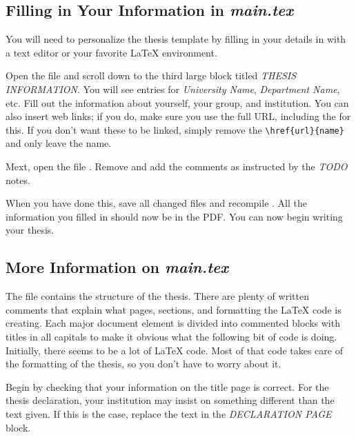 \subsection{Filling in Your Information in \emph{main.tex}}\label{sec:fillingdetails}

You will need to personalize the thesis template by filling in your details in  with a text editor or your favorite LaTeX environment.

Open the file and scroll down to the third large block titled \emph{THESIS INFORMATION}. You will see entries for \emph{University Name}, \emph{Department Name}, etc. Fill out the information about yourself, your group, and institution.%
You can also insert web links; if you do, make sure you use the full URL, including the  for this. If you don't want these to be linked, simply remove the \verb|\href{url}{name}| and only leave the name.

Mext, open the file . Remove and add the comments as instructed by the \emph{TODO} notes.

When you have done this, save all changed files and recompile . All the information you filled in should now be in the PDF. You can now begin writing your thesis.


\subsection{More Information on \emph{main.tex}}

The  file contains the structure of the thesis. There are plenty of written comments that explain what pages, sections, and formatting the LaTeX code is creating.
Each major document element is divided into commented blocks with titles in all capitals to make it obvious what the following bit of code is doing. Initially, there seems to be a lot of LaTeX code. Most of that code takes care of the formatting of the thesis, so you don't have to worry about it.

Begin by checking that your information on the title page is correct. For the thesis declaration, your institution may insist on something different than the text given. If this is the case, replace the text in the \emph{DECLARATION PAGE} block.

